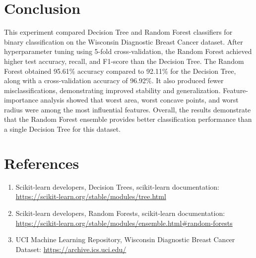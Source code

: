 \documentclass[12pt,a4paper]{article}
\begin{document}
\section{Conclusion}

This experiment compared Decision Tree and Random Forest classifiers for binary classification on the Wisconsin Diagnostic Breast Cancer dataset. After hyperparameter tuning using 5-fold cross-validation, the Random Forest achieved higher test accuracy, recall, and F1-score than the Decision Tree. The Random Forest obtained 95.61\% accuracy compared to 92.11\% for the Decision Tree, along with a cross-validation accuracy of 96.92\%. It also produced fewer misclassifications, demonstrating improved stability and generalization. Feature-importance analysis showed that worst area, worst concave points, and worst radius were among the most influential features. Overall, the results demonstrate that the Random Forest ensemble provides better classification performance than a single Decision Tree for this dataset.

\section{References}
\begin{enumerate}
\item Scikit-learn developers, Decision Trees, scikit-learn documentation: \url{https://scikit-learn.org/stable/modules/tree.html}

\item Scikit-learn developers, Random Forests, scikit-learn documentation: \url{https://scikit-learn.org/stable/modules/ensemble.html#random-forests}

\item UCI Machine Learning Repository, Wisconsin Diagnostic Breast Cancer Dataset: \url{https://archive.ics.uci.edu/}
\end{enumerate}
\end{document}
